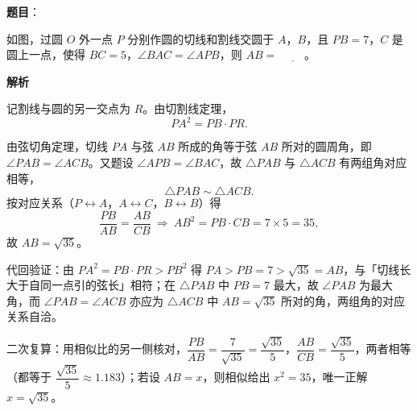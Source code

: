 \begin{answer}

\textbf{题目}：

如图，过圆 $O$ 外一点 $P$ 分别作圆的切线和割线交圆于 $A$，$B$，且 $PB=7$，$C$ 是圆上一点，使得 $BC=5$，$\angle BAC=\angle APB$，则 $AB=$ $\underline{\qquad}$。
\nopagebreak[4]
\begin{center}\end{center}
\nopagebreak[4]
\textbf{解析}

记割线与圆的另一交点为 $R$。由切割线定理，
\nopagebreak[4]
\[PA^2=PB\cdot PR.\]

由弦切角定理，切线 $PA$ 与弦 $AB$ 所成的角等于弦 $AB$ 所对的圆周角，即 $\angle PAB=\angle ACB$。又题设 $\angle APB=\angle BAC$，故 $\triangle PAB$ 与 $\triangle ACB$ 有两组角对应相等，
\nopagebreak[4]
\[\triangle PAB\sim\triangle ACB.\]
按对应关系（$P\leftrightarrow A$，$A\leftrightarrow C$，$B\leftrightarrow B$）得
\nopagebreak[4]
\[\frac{PB}{AB}=\frac{AB}{CB}\ \Longrightarrow\ AB^2=PB\cdot CB=7\times5=35,\]
故 $AB=\sqrt{35}$。

代回验证：由 $PA^2=PB\cdot PR>PB^2$ 得 $PA>PB=7>\sqrt{35}=AB$，与「切线长大于自同一点引的弦长」相符；在 $\triangle PAB$ 中 $PB=7$ 最大，故 $\angle PAB$ 为最大角，而 $\angle PAB=\angle ACB$ 亦应为 $\triangle ACB$ 中 $AB=\sqrt{35}$ 所对的角，两组角的对应关系自洽。

二次复算：用相似比的另一侧核对，$\dfrac{PB}{AB}=\dfrac{7}{\sqrt{35}}=\dfrac{\sqrt{35}}{5}$，$\dfrac{AB}{CB}=\dfrac{\sqrt{35}}{5}$，两者相等（都等于 $\dfrac{\sqrt{35}}{5}\approx1.183$）；若设 $AB=x$，则相似给出 $x^2=35$，唯一正解 $x=\sqrt{35}$。


\end{answer}
